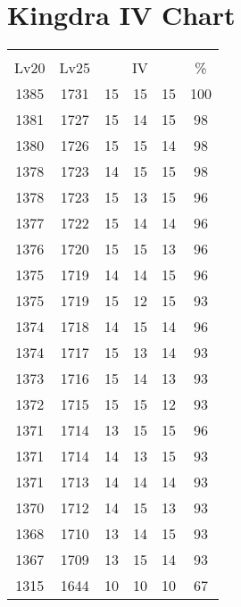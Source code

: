 \documentclass{article}%
\begin{document}
%
\normalsize%
\section{Kingdra IV Chart}%
\label{sec:Kingdra IV Chart}%
\renewcommand{\arraystretch}{1.5}%
\begin{tabular}{|c|c|c|c|c|c|}%
\hline%
\multicolumn{6}{|c|}{\textcolor{white}{ 
\linebreak{Kingdra}
}%
\cellcolor{black}}\\%
\multicolumn{1}{|c}{Lv20}&\multicolumn{1}{c|}{Lv25}&\multicolumn{3}{c|}{IV}&\multicolumn{1}{|c|}{\%}\\%
\hline%
\rowcolor{color100}%
1385&1731&15&15&15&100\\%
\hline%
\rowcolor{color98}%
1381&1727&15&14&15&98\\%
\hline%
\rowcolor{color98}%
1380&1726&15&15&14&98\\%
\hline%
\rowcolor{color98}%
1378&1723&14&15&15&98\\%
\hline%
\rowcolor{color96}%
1378&1723&15&13&15&96\\%
\hline%
\rowcolor{color96}%
1377&1722&15&14&14&96\\%
\hline%
\rowcolor{color96}%
1376&1720&15&15&13&96\\%
\hline%
\rowcolor{color96}%
1375&1719&14&14&15&96\\%
\hline%
\rowcolor{color93}%
1375&1719&15&12&15&93\\%
\hline%
\rowcolor{color96}%
1374&1718&14&15&14&96\\%
\hline%
\rowcolor{color93}%
1374&1717&15&13&14&93\\%
\hline%
\rowcolor{color93}%
1373&1716&15&14&13&93\\%
\hline%
\rowcolor{color93}%
1372&1715&15&15&12&93\\%
\hline%
\rowcolor{color96}%
1371&1714&13&15&15&96\\%
\hline%
\rowcolor{color93}%
1371&1714&14&13&15&93\\%
\hline%
\rowcolor{color93}%
1371&1713&14&14&14&93\\%
\hline%
\rowcolor{color93}%
1370&1712&14&15&13&93\\%
\hline%
\rowcolor{color93}%
1368&1710&13&14&15&93\\%
\hline%
\rowcolor{color93}%
1367&1709&13&15&14&93\\%
\hline%
\rowcolor{color91}%
1315&1644&10&10&10&67\\%
\end{tabular}

%
\end{document}
